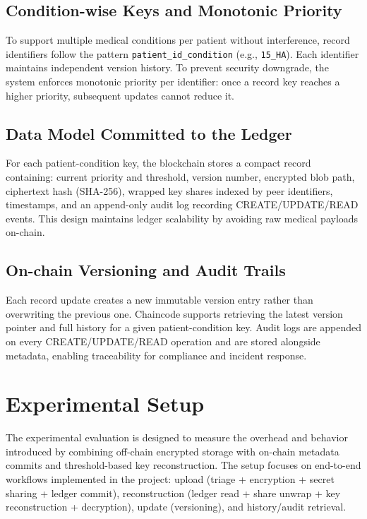 \documentclass{IEEEtran}
\begin{document}
\subsection{Condition-wise Keys and Monotonic Priority}
To support multiple medical conditions per patient without interference, record identifiers follow the pattern \texttt{patient\_id\_condition} (e.g., \texttt{15\_HA}). Each identifier maintains independent version history. To prevent security downgrade, the system enforces monotonic priority per identifier: once a record key reaches a higher priority, subsequent updates cannot reduce it.



\subsection{Data Model Committed to the Ledger}
For each patient-condition key, the blockchain stores a compact record containing: current priority and threshold, version number, encrypted blob path, ciphertext hash (SHA-256), wrapped key shares indexed by peer identifiers, timestamps, and an append-only audit log recording CREATE/UPDATE/READ events. This design maintains ledger scalability by avoiding raw medical payloads on-chain.

\subsection{On-chain Versioning and Audit Trails}
Each record update creates a new immutable version entry rather than overwriting the previous one. Chaincode supports retrieving the latest version pointer and full history for a given patient-condition key. Audit logs are appended on every CREATE/UPDATE/READ operation and are stored alongside metadata, enabling traceability for compliance and incident response.

\section{Experimental Setup}
The experimental evaluation is designed to measure the overhead and behavior introduced by combining off-chain encrypted storage with on-chain metadata commits and threshold-based key reconstruction. The setup focuses on end-to-end workflows implemented in the project: upload (triage + encryption + secret sharing + ledger commit), reconstruction (ledger read + share unwrap + key reconstruction + decryption), update (versioning), and history/audit retrieval.
\end{document}

